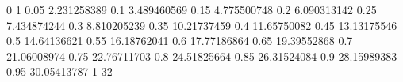 0 1
0.05 2.231258389
0.1 3.489460569
0.15 4.775500748
0.2 6.090313142
0.25 7.434874244
0.3 8.810205239
0.35 10.21737459
0.4 11.65750082
0.45 13.13175546
0.5 14.64136621
0.55 16.18762041
0.6 17.77186864
0.65 19.39552868
0.7 21.06008974
0.75 22.76711703
0.8 24.51825664
0.85 26.31524084
0.9 28.15989383
0.95 30.05413787
1 32






















